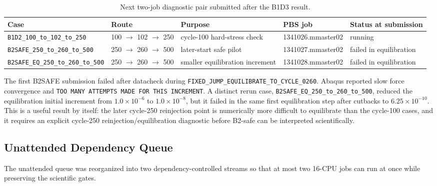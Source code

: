 \documentclass[11pt,a4paper]{article}
\newcommand{\code}[1]{\texttt{#1}}
\begin{document}
\begin{table}[H]
\centering
\caption{Next two-job diagnostic pair submitted after the B1D3 result.}
\begin{tabular}{lllll}
\toprule
Case & Route & Purpose & PBS job & Status at submission \\
\midrule
\code{B1D2\_100\_to\_102\_to\_250} & 100 $\rightarrow$ 102 $\rightarrow$ 250 & cycle-100 hard-stress check & 1341026.mmaster02 & running \\
\code{B2SAFE\_250\_to\_260\_to\_500} & 250 $\rightarrow$ 260 $\rightarrow$ 500 & later-start safe pilot & 1341027.mmaster02 & failed in equilibration \\
\code{B2SAFE\_EQ\_250\_to\_260\_to\_500} & 250 $\rightarrow$ 260 $\rightarrow$ 500 & smaller equilibration increment & 1341028.mmaster02 & failed in equilibration \\
\bottomrule
\end{tabular}
\end{table}

The first B2SAFE submission failed after datacheck during \code{FIXED\_JUMP\_EQUILIBRATE\_TO\_CYCLE\_0260}. Abaqus reported slow force convergence and \code{TOO MANY ATTEMPTS MADE FOR THIS INCREMENT}. A distinct rerun case, \code{B2SAFE\_EQ\_250\_to\_260\_to\_500}, reduced the equilibration initial increment from $1.0 \times 10^{-6}$ to $1.0 \times 10^{-8}$, but it failed in the same first equilibration step after cutbacks to $6.25 \times 10^{-10}$. This is a useful result by itself: the later cycle-250 reinjection point is numerically more difficult to equilibrate than the cycle-100 cases, and it requires an explicit cycle-250 reinjection/equilibration diagnostic before B2-safe can be interpreted scientifically.

\subsection{Unattended Dependency Queue}

The unattended queue was reorganized into two dependency-controlled streams so that at most two 16-CPU jobs can run at once while preserving the scientific gates.
\end{document}
